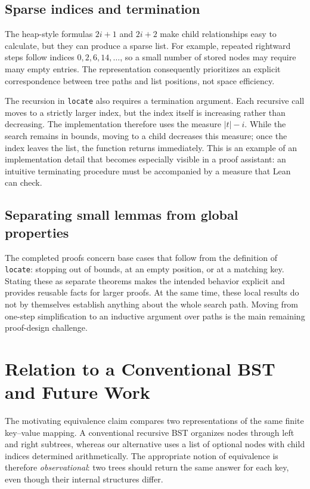 \documentclass[10pt]{article}
\begin{document}
\subsection{Sparse indices and termination}

The heap-style formulas $2i+1$ and $2i+2$ make child relationships easy to calculate, but they can produce a sparse list. For example, repeated rightward steps follow indices $0,2,6,14,\ldots$, so a small number of stored nodes may require many empty entries. The representation consequently prioritizes an explicit correspondence between tree paths and list positions, not space efficiency.

The recursion in \texttt{locate} also requires a termination argument. Each recursive call moves to a strictly larger index, but the index itself is increasing rather than decreasing. The implementation therefore uses the measure $|t|-i$. While the search remains in bounds, moving to a child decreases this measure; once the index leaves the list, the function returns immediately. This is an example of an implementation detail that becomes especially visible in a proof assistant: an intuitive terminating procedure must be accompanied by a measure that Lean can check.

\subsection{Separating small lemmas from global properties}

The completed proofs concern base cases that follow from the definition of \texttt{locate}: stopping out of bounds, at an empty position, or at a matching key. Stating these as separate theorems makes the intended behavior explicit and provides reusable facts for larger proofs. At the same time, these local results do not by themselves establish anything about the whole search path. Moving from one-step simplification to an inductive argument over paths is the main remaining proof-design challenge.

\section{Relation to a Conventional BST and Future Work}

The motivating equivalence claim compares two representations of the same finite key--value mapping. A conventional recursive BST organizes nodes through left and right subtrees, whereas our alternative uses a list of optional nodes with child indices determined arithmetically. The appropriate notion of equivalence is therefore \emph{observational}: two trees should return the same answer for each key, even though their internal structures differ.
\end{document}
